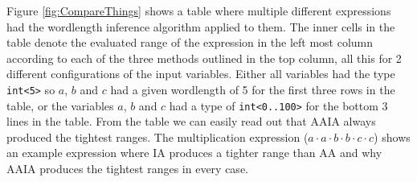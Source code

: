 Figure \ref{fig:CompareThings} shows a table where multiple different expressions had the wordlength inference algorithm applied to them. The inner cells in the table denote the evaluated range of the expression in the left most column according to each of the three methods outlined in the top column, all this for 2 different configurations of the input variables. Either all variables had the type \verb+int<5>+ so $a$, $b$ and $c$ had a given wordlength of 5 for the first three rows in the table, or the variables $a$, $b$ and $c$ had a type of \verb+int<0..100>+ for the bottom 3 lines in the table. From the table we can easily read out that AAIA always produced the tightest ranges. The multiplication expression ($a \cdot a \cdot b \cdot b \cdot c \cdot c$) shows an example expression where IA produces a tighter range than AA and why AAIA produces the tightest ranges in every case.
